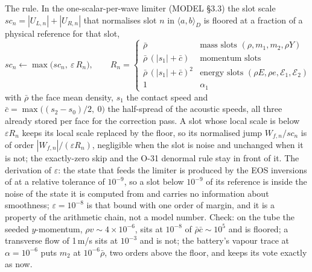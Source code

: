 \documentclass[11pt,a4paper]{article}
\begin{document}
The rule.  In the one-scalar-per-wave limiter (MODEL \S3.3) the slot
scale $sc_n = |U_{L,n}| + |U_{R,n}|$ that normalises slot $n$ in
$\langle a,b\rangle_D$ is floored at a fraction of a physical reference
for that slot,
\[
  sc_n \leftarrow \max\big(sc_n,\ \varepsilon\,R_n\big),\qquad
  R_n = \begin{cases}
    \bar\rho & \text{mass slots } (\rho, m_1, m_2, \rho Y)\\
    \bar\rho\,(|s_1| + \bar c) & \text{momentum slots}\\
    \bar\rho\,(|s_1| + \bar c)^2 & \text{energy slots } (\rho E, \rho e, \mathcal{E}_1, \mathcal{E}_2)\\
    1 & \alpha_1
  \end{cases}
\]
with $\bar\rho$ the face mean density, $s_1$ the contact speed and
$\bar c = \max\big((s_2 - s_0)/2,\ 0\big)$ the half-spread of the acoustic
speeds, all three already stored per face for the correction pass.  A
slot whose local scale is below $\varepsilon R_n$ keeps its local scale
replaced by the floor, so its normalised jump $W_{f,n}/sc_n$ is of order
$|W_{f,n}|/(\varepsilon R_n)$, negligible when the slot is noise and
unchanged when it is not; the exactly-zero skip and the O-31 denormal rule
stay in front of it.  The derivation of $\varepsilon$: the state that
feeds the limiter is produced by the EOS inversions of
 at a relative tolerance of $10^{-9}$, so a slot
below $10^{-9}$ of its reference is inside the noise of the state it is
computed from and carries no information about smoothness;
$\varepsilon = 10^{-8}$ is that bound with one order of margin, and it is
a property of the arithmetic chain, not a model number.  Check: on the
tube the seeded $y$-momentum, $\rho v \sim 4\times10^{-6}$, sits at
$10^{-8}$ of $\bar\rho\bar c \sim 10^{5}$ and is floored; a transverse
flow of 1\,m/s sits at $10^{-3}$ and is not; the battery's vapour trace at
$\alpha = 10^{-6}$ puts $m_2$ at $10^{-6}\bar\rho$, two orders above the
floor, and keeps its vote exactly as now.
\end{document}
